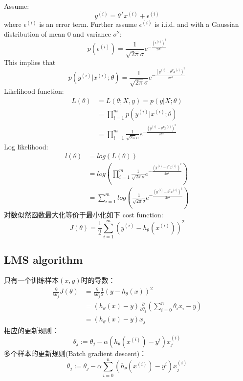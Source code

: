 \documentclass[UTF8]{ctexart}
\begin{document}
	Assume: 
	\begin{equation*}
		y^{(i)}=\theta^Tx^{(i)}+\epsilon^{(i)}
	\end{equation*}
	where $\epsilon^{(i)}$ is an error term. Further assume $\epsilon^{(i)}$ is i.i.d. and with a Gaussian distribution of mean 0 and variance $\sigma^2$:
	\begin{equation*}
		p(\epsilon^{(i)}) = \frac{1}{\sqrt{2\pi}\sigma}e^{-\frac{(\epsilon^{(i)})^2}{2\sigma^2}}
	\end{equation*}
	This implies that
	\begin{equation*}
		p(y^{(i)}|x^{(i)};\theta) = \frac{1}{\sqrt{2\pi}\sigma}e^{-\frac{(y^{(i)}-\theta^Tx^{(i)})^2}{2\sigma^2}}
	\end{equation*}
	Likelihood function:
	\begin{equation*}
	\begin{aligned}
		L(\theta) & = L(\theta;X,y) = p(y|X;\theta) \\
		& = \prod_{i=1}^{m}p(y^{(i)}|x^{(i)};\theta) \\
		& = \prod_{i=1}^{m}\frac{1}{\sqrt{2\pi}\sigma}e^{-\frac{(y^{(i)}-\theta^Tx^{(i)})^2}{2\sigma^2}}
	\end{aligned}
	\end{equation*}
	Log likelihood:
	\begin{equation*}
	\begin{aligned}
		l(\theta) & = log(L(\theta)) \\
		& = log(\prod_{i=1}^{m}\frac{1}{\sqrt{2\pi}\sigma}e^{-\frac{(y^{(i)}-\theta^Tx^{(i)})^2}{2\sigma^2}}) \\
		& = \sum_{i=1}^{m}log(\frac{1}{\sqrt{2\pi}\sigma}e^{-\frac{(y^{(i)}-\theta^Tx^{(i)})^2}{2\sigma^2}})
	\end{aligned}
	\end{equation*}
	对数似然函数最大化等价于最小化如下 cost function:
	\begin{equation*}
		J(\theta)=\frac{1}{2}\sum_{i=1}^{m}(y^{(i)}-h_\theta(x^{(i)}))^2
	\end{equation*}
	\subsection{LMS algorithm}
	只有一个训练样本$(x,y)$时的导数：
	\begin{equation*}
	\begin{aligned}
	\frac{\partial}{\partial\theta_j}J(\theta) & =\frac{\partial}{\partial\theta_j}\frac{1}{2}(y-h_\theta(x))^2 \\
	& =(h_\theta(x)-y)\frac{\partial}{\partial\theta_j}(\sum_{i=0}^{n}\theta_ix_i-y)\\
	& =(h_\theta(x)-y)x_j
	\end{aligned}
	\end{equation*}
	相应的更新规则：
	\begin{equation*}
		\theta_j:=\theta_j-\alpha(h_\theta(x^{(i)})-y^i)x^{(i)}_j
	\end{equation*}
	多个样本的更新规则(Batch gradient descent)：
	\begin{equation*}
			\theta_j:=\theta_j-\alpha\sum_{i=0}^{n}(h_\theta(x^{(i)})-y^i)x^{(i)}_j
	\end{equation*}
	
\end{document}
